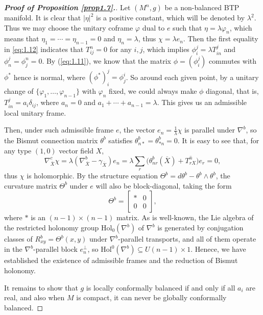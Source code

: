 \documentclass{amsart}
\numberwithin{equation}{section}
\theoremstyle{definition}
\renewcommand{\1}{\mathds{1}}
\renewcommand{\>}{\rightarrow}
\begin{document}
\begin{proof}[{\bf Proof of Proposition \ref{prop1.7}.}]
Let $(M^n,g)$ be a non-balanced BTP manifold. It is clear that $|\eta|^2$ is a positive constant,
which will be denoted by $\lambda^2$. Thus we may choose the unitary coframe $\varphi$ dual to $e$
such that $\eta = \lambda \varphi_n$, which means that $\eta_1=\cdots=\eta_{n-1}=0$ and $\eta_n=\lambda$, thus $\chi=\lambda e_n$.
Then the first equality in \eqref{eq:1.12} indicates that $T^n_{ij}=0$ for any $i,j$,
which implies $\phi_i^j=\lambda T^j_{in}$ and $\phi_n^{j} = \phi^n_{j}=0$.
By (\ref{eq:1.11}), we know that the matrix $\phi = (\phi_i^j)$ commutes with $\phi^{\ast}$ hence is normal,
where $(\phi^{\ast})_i^j=\phi_j^i$.  So around each given point,
by a unitary change of $\{ \varphi_1 , \ldots , \varphi_{n-1}\}$ with $\varphi_n$ fixed,
we could always make $\phi$ diagonal, that is, $T^j_{in}=a_i\delta_{ij}$, where $a_n=0$ and $a_1+\cdots +a_{n-1}=\lambda$.
This gives us an admissible local unitary frame.

Then, under such admissible frame $e$, the vector $e_n=\frac{1}{\lambda}\chi$ is parallel under $\nabla^b$, so the Bismut connection matrix $\theta^b$ satisfies $\theta^b_{n\ast}=\theta^b_{\ast n}=0$. It is easy to see that, for any type $(1,0)$ vector field $X$,
\[\nabla^c_{\overline{X}}\chi=\lambda (\nabla^b_{\overline{X}} -  \gamma_{\overline{X}})e_n=\lambda \sum_r \big( \theta^b_{nr}(\overline{X}) + \overline{T^n_{rX}} \big)e_r=0,\]
thus $\chi$ is holomorphic. By the structure equation $\Theta^b=d\theta^b-\theta^b\wedge \theta^b$, the curvature matrix $\Theta^b$ under $e$ will also be block-diagonal, taking the form
$$ \Theta^b = \left[ \begin{array}{cc} \ast & 0 \\ 0 & 0 \end{array} \right]\!\!, $$
where $\ast$ is an $(n\!-\!1)\times (n\!-\!1)$ matrix. As is well-known,
the Lie algebra of the restricted holonomy group $\mbox{Hol}_{0}(\nabla^b)$ of $\nabla^b$
is generated by conjugation classes of $R^b_{xy}=\Theta^b(x,y)$ under $\nabla^b$-parallel transports,
and all of them operate in the $\nabla^b$-parallel block $e_n^{\perp}$, so $\mbox{Hol}^{0}(\nabla^b) \subseteq U(n-1) \times 1$.
Henece, we have established the existence of admissible frames and the reduction of Bismut holonomy.

It remains to show that $g$ is locally conformally balanced
if and only if all $a_i$ are real, and also when $M$ is compact, it can never be globally conformally balanced.


\end{proof}
\end{document}
